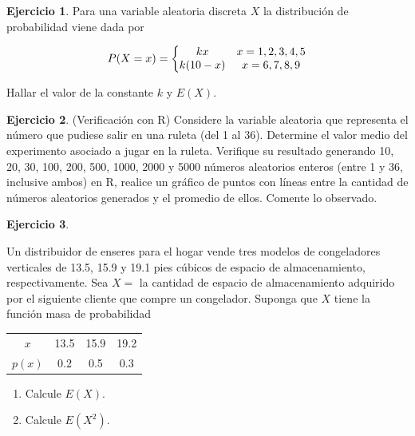 \documentclass[
  11pt,
]{book}
\providecommand{\tightlist}{%
  \setlength{\itemsep}{0pt}\setlength{\parskip}{0pt}}
\theoremstyle{definition}
\theoremstyle{definition}
\theoremstyle{definition}
\newtheorem{exercise}{Ejercicio}[chapter]
\theoremstyle{definition}
\theoremstyle{remark}
\begin{document}
\begin{exercise}
\protect\hypertarget{exr:exesperanza1}{}\label{exr:exesperanza1}Para una variable aleatoria discreta \(X\) la distribución de probabilidad viene dada por

\begin{equation}
\notag
P(X = x) = \left\lbrace 
\begin{matrix}
kx & x = 1,2,3,4,5\\
k(10-x) & x = 6,7,8,9
\end{matrix}
\right.
\end{equation}

Hallar el valor de la constante \(k\) y \(E(X)\).
\end{exercise}

\begin{exercise}
(Verificación con R) Considere la variable aleatoria que representa el número que pudiese salir en una ruleta (del 1 al 36). Determine el valor medio del experimento asociado a jugar en la ruleta. Verifique su resultado generando 10, 20, 30, 100, 200, 500, 1000, 2000 y 5000 números aleatorios enteros (entre 1 y 36, inclusive ambos) en R, realice un gráfico de puntos con líneas entre la cantidad de números aleatorios generados y el promedio de ellos. Comente lo observado.
\end{exercise}

\begin{exercise}
\protect\hypertarget{exr:exesperanza2}{}\label{exr:exesperanza2}

Un distribuidor de enseres para el hogar vende tres modelos de congeladores verticales de 13.5, 15.9 y 19.1 pies cúbicos de espacio de almacenamiento, respectivamente. Sea
\(X =\) la cantidad de espacio de almacenamiento adquirido por el siguiente cliente que compre un congelador. Suponga que \(X\) tiene la función masa de probabilidad

\begin{table}[H]
\centering
\begin{tabular}[t]{cccc}
\toprule
$x$ & 13.5 & 15.9 & 19.2\\
$p(x)$ & 0.2 & 0.5 & 0.3\\
\bottomrule
\end{tabular}
\end{table}

\begin{enumerate}
\def\labelenumi{\arabic{enumi}.}
\tightlist
\item
  Calcule \(E(X)\).
\item
  Calcule \(E(X^2)\).
\end{enumerate}

\end{exercise}
\end{document}
